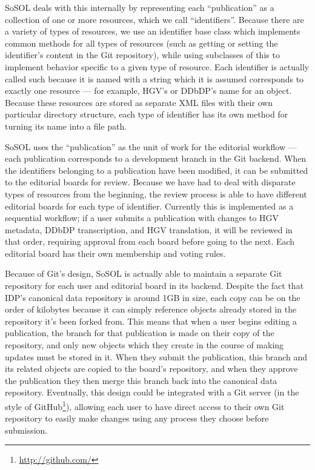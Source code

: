 \documentclass[]{article}
\begin{document}
SoSOL deals with this internally by representing each “publication” as a collection of one or more resources, which we call “identifiers”. Because there are a variety of types of resources, we use an identifier base class which implements common methods for all types of resources (such as getting or setting the identifier's content in the Git repository), while using subclasses of this to implement behavior specific to a given type of resource. Each identifier is actually called such because it is named with a string which it is assumed corresponds to exactly one resource — for example, HGV's or DDbDP's name for an object. Because these resources are stored as separate XML files with their own particular directory structure, each type of identifier has its own method for turning its name into a file path.

SoSOL uses the “publication” as the unit of work for the editorial workflow  — each publication corresponds to a development branch in the Git backend. When the identifiers belonging to a publication have been modified, it can be submitted to the editorial boards for review. Because we have had to deal with disparate types of resources from the beginning, the review process is able to have different editorial boards for each type of identifier. Currently this is implemented as a sequential workflow; if a user submits a publication with changes to HGV metadata, DDbDP transcription, and HGV translation, it will be reviewed in that order, requiring approval from each board before going to the next. Each editorial board has their own membership and voting rules.

Because of Git's design, SoSOL is actually able to maintain a separate Git repository for each user and editorial board in its backend. Despite the fact that IDP's canonical data repository is around 1GB in size, each copy can be on the order of kilobytes because it can simply reference objects already stored in the repository it's been forked from. This means that when a user begins editing a publication, the branch for that publication is made on their copy of the repository, and only new objects which they create in the course of making updates must be stored in it. When they submit the publication, this branch and its related objects are copied to the board's repository, and when they approve the publication they then merge this branch back into the canonical data repository. Eventually, this design could be integrated with a Git server (in the style of GitHub\footnote{\url{http://github.com/}}), allowing each user to have direct access to their own Git repository to easily make changes using any process they choose before submission.
\end{document}
